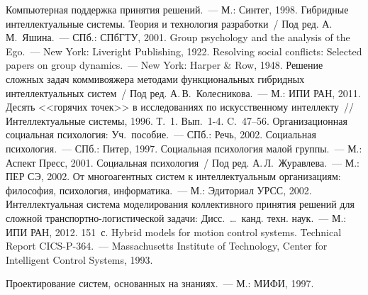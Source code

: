 \begin{multicols}{2}
{{\begin{thebibliography}{99}
 Компьютерная поддержка принятия решений.~--- М.: Синтег, 1998.
 Гибридные интеллектуальные сис\-те\-мы. Теория и технология 
разработки~/ Под ред. А.\,М.~Яшина.~--- СПб.: СПбГТУ, 2001.
 Group psychology and the analysis of the Ego.~--- New York: Liveright Publishing, 
1922. 
 Resolving social conflicts: Selected papers on group dynamics.~--- New York: 
Harper \& Row, 1948.
 Решение сложных задач коммивояжера методами функциональных 
гибридных интеллектуальных сис\-тем~/ Под ред. А.\,В.~Колесникова.~--- М.: ИПИ РАН, 
2011.
 Десять <<горячих точек>> в исследованиях по искусственному 
интеллекту~// Интеллектуальные системы, 1996. Т.~1. Вып.~1-4. C.~47--56.
 Организационная социальная психология: Уч.\ 
пособие.~--- СПб.: Речь, 2002. 
 Социальная психология.~--- СПб.: Питер, 1997.
 Социальная психология малой группы.~--- М.: 
Аспект Пресс, 2001.
Социальная психология~/ Под ред. А.\,Л.~Журавлева.~--- М.: ПЕР СЭ, 2002.
\bibitem{11-lis}
 От многоагентных систем к интеллектуальным организациям: 
философия, психология, информатика.~--- М.: Эдиториал УРСС, 2002. 
\bibitem{12-lis}
 Интеллектуальная система моделирования коллективного принятия 
решений для сложной транс\-порт\-но-ло\-ги\-сти\-че\-ской задачи: Дисс.\ \ldots\ канд. техн. 
наук.~--- М.: ИПИ РАН, 2012. 151~с.
 Hybrid models for motion control systems. Technical Report 
CICS-P-364.~--- Massachusetts Institute of Technology, Center for Intelligent Control Systems, 
1993.

\label{end\stat}

 Проектирование систем, основанных на знаниях.~--- М.: МИФИ, 
1997. 
\end{thebibliography} } }

\end{multicols}